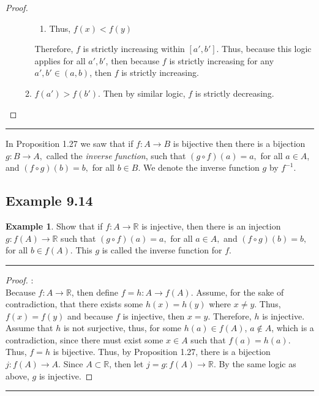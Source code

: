 \documentclass[openany, amssymb, psamsfonts]{amsart}
\newcommand{\bbR}{\mathbb{R}}
\newcommand{\arr}{\longrightarrow}
\theoremstyle{definition}
\newtheorem{exmp}{Example}[section]
\numberwithin{equation}{section}
\begin{document}
\begin{proof}
\begin{enumerate}
\begin{enumerate}
\begin{enumerate}
            \item Thus, $f(x) < f(y)$ 
        \end{enumerate}
        Therefore, $f$ is strictly increasing within $[a',b']$. Thus, because this logic applies for all $a',b'$, then because $f$ is strictly increasing for any $a',b' \in (a,b)$, then $f$ is strictly increasing.
        \item $f(a') > f(b')$. Then by similar logic, $f$ is strictly decreasing.
    \end{enumerate}
\end{enumerate}
\end{proof}\vspace{4pt}     \hrule   \vspace{4pt}
In Proposition 1.27 we saw that if $f:A\longrightarrow B$ is bijective then there is a bijection $g:B\longrightarrow A,$ called the {\em inverse function},  such that $(g\circ f)(a)=a, $ for all $a\in A$, and $(f\circ g)(b)=b,$ for all $b\in B.$ 
We denote the inverse function $g$  by $f^{-1}$. 

\subsection*{Example 9.14}
\begin{exmp} 
\label{9.14}
Show that if $f\colon A\to \bbR$ is injective, then there is an injection $g:f(A)\to \bbR$  such that $(g\circ f)(a)=a,$ for all $a\in A,$ and $(f\circ g)(b)=b,$ for all $b\in f(A).$  
This $g$ is called the inverse function for $f.$
\end{exmp}
\vspace{4pt}     \hrule   \vspace{4pt}\begin{proof}:\\
Because $f\colon A \arr \bbR$, then define $f=h\colon A \arr f(A)$. Assume, for the sake of contradiction, that there exists some $h(x) = h(y)$ where $x\neq y$. Thus, $f(x) = f(y)$ and because $f$ is injective, then $x=y$. Therefore, $h$ is injective. Assume that $h$ is not surjective, thus, for some $h(a) \in f(A)$, $a\notin A$, which is a contradiction, since there must exist some $x\in A$ such that $f(a) = h(a)$. Thus, $f=h$ is bijective. Thus, by Proposition 1.27, there is a bijection $j\colon f(A) \arr A$. Since $A\subset \bbR$, then let $j=g\colon f(A) \arr \bbR$. By the same logic as above, $g$ is injective.  
\end{proof}\vspace{4pt}     \hrule   \vspace{4pt}
\end{document}
